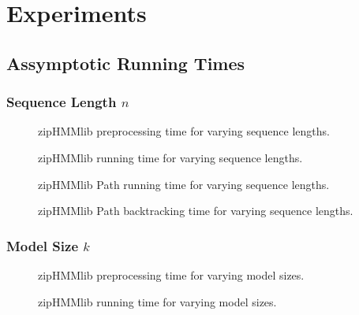 \chapter{Experiments}
\label{cha:experiments}

\section{Assymptotic Running Times}
\label{sec:assymp-runn-times}

\subsection{Sequence Length $n$}
\label{sec:sequence-length-n}

\begin{figure}[H]
  \centering
  
  \caption{zipHMMlib preprocessing time for varying sequence lengths.}
  \label{fig:pre_viterbi_n}
\end{figure}

\begin{figure}[H]
  \centering
  
  \caption{zipHMMlib running time for varying sequence lengths.}
  \label{fig:assymptotic_viterbi_n}
\end{figure}

\begin{figure}[H]
  \centering
  
  \caption{zipHMMlib Path running time for varying sequence lengths.}
  \label{fig:assymptotic_viterbi_path_n}
\end{figure}

\begin{figure}[H]
  \centering
  
  \caption{zipHMMlib Path backtracking time for varying sequence lengths.}
  \label{fig:assymptotic_viterbi_backtrack_n}
\end{figure}

\subsection{Model Size $k$}
\label{sec:model-size-k}

\begin{figure}[H]
  \centering
  
  \caption{zipHMMlib preprocessing time for varying model sizes.}
  \label{fig:pre_viterbi_k}
\end{figure}

\begin{figure}[H]
  \centering
  
  \caption{zipHMMlib running time for varying model sizes.}
  \label{fig:assymptotic_viterbi_k}
\end{figure}

